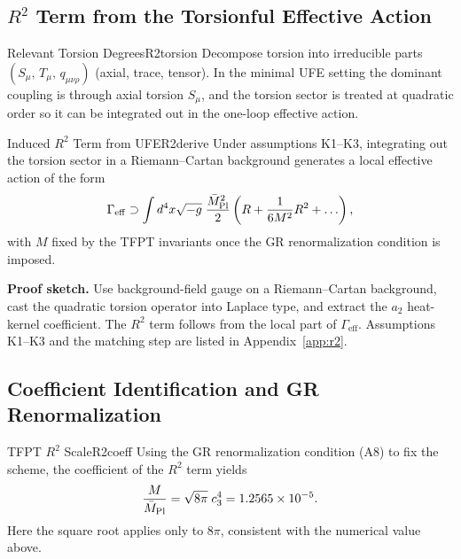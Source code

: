 \subsection{$R^2$ Term from the Torsionful Effective Action}
\label{sec:r2derive}

\begin{definition}{Relevant Torsion Degrees}{R2torsion}
Decompose torsion into irreducible parts $(S_\mu,\,T_\mu,\,q_{\mu\nu\rho})$ (axial, trace, tensor).
In the minimal UFE setting the dominant coupling is through axial torsion $S_\mu$, and the
torsion sector is treated at quadratic order so it can be integrated out in the one-loop
effective action.
\end{definition}

\begin{theorem}{Induced $R^2$ Term from UFE}{R2derive}
Under assumptions K1--K3, integrating out the torsion sector in a Riemann--Cartan background
generates a local effective action of the form
\begin{equation}
    \Gamma_{\mathrm{eff}} \supset \int d^4x\sqrt{-g}\;\frac{\bar{M}_{\mathrm{Pl}}^2}{2}
    \left(R + \frac{1}{6M^2}R^2 + \ldots\right),
\end{equation}
with $M$ fixed by the TFPT invariants once the GR renormalization condition is imposed.
\end{theorem}

\textbf{Proof sketch.} Use background-field gauge on a Riemann--Cartan background, cast the
quadratic torsion operator into Laplace type, and extract the $a_2$ heat-kernel coefficient.
The $R^2$ term follows from the local part of $\Gamma_{\mathrm{eff}}$. Assumptions K1--K3 and
the matching step are listed in Appendix~\ref{app:r2}.

\subsection{Coefficient Identification and GR Renormalization}

\begin{theorem}{TFPT $R^2$ Scale}{R2coeff}
Using the GR renormalization condition (A8) to fix the scheme, the coefficient of the
$R^2$ term yields
\begin{equation}
    \frac{M}{\bar{M}_{\mathrm{Pl}}}=\sqrt{8\pi}\;c_3^4
    = 1.2565\times 10^{-5}.
    \label{eq:R2scale}
\end{equation}
Here the square root applies only to $8\pi$, consistent with the numerical value above.
\end{theorem}

